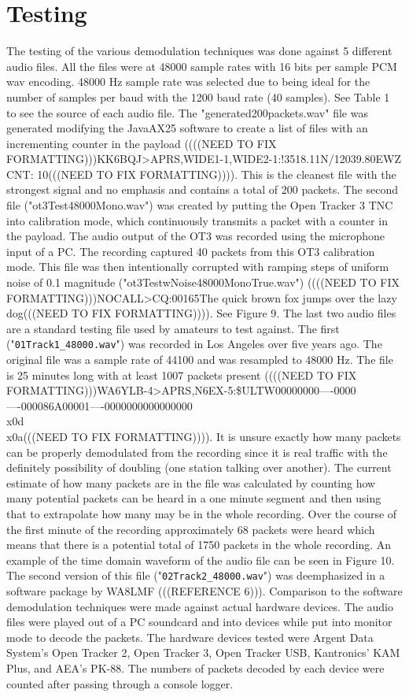 \chapter{Testing}

The testing of the various demodulation techniques was done against 5 different audio files. All the files were at 48000 sample rates with 16 bits per sample PCM wav encoding. 48000 Hz sample rate was selected due to being ideal for the number of samples per baud with the 1200 baud rate (40 samples). See Table 1 to see the source of each audio file. The "generated200packets.wav" file was generated modifying the JavaAX25 software to create a list of files with an incrementing counter in the payload ((((NEED TO FIX FORMATTING)))KK6BQJ>APRS,WIDE1-1,WIDE2-1:!3518.11N/12039.80EWZ CNT: 10(((NEED TO FIX FORMATTING)))). This is the cleanest file with the strongest signal and no emphasis and contains a total of 200 packets. The second file ("ot3Test48000Mono.wav") was created by putting the Open Tracker 3 TNC into calibration mode, which continuously transmits a packet with a counter in the payload. The audio output of the OT3 was recorded using the microphone input of a PC. The recording captured 40 packets from this OT3 calibration mode. This file was then intentionally corrupted with ramping steps of uniform noise of 0.1 magnitude ("ot3TestwNoise48000MonoTrue.wav") ((((NEED TO FIX FORMATTING)))NOCALL>CQ:00165The quick brown fox jumps over the lazy dog(((NEED TO FIX FORMATTING)))). See Figure 9.  The last two audio files are a standard testing file used by amateurs to test against. The first ("\verb|01Track1_48000.wav|") was recorded in Los Angeles over five years ago. The original file was a sample rate of 44100 and was resampled to 48000 Hz. The file is 25 minutes long with at least 1007 packets present ((((NEED TO FIX FORMATTING)))WA6YLB-4>APRS,N6EX-5:\$ULTW00000000----0000----000086A00001----0000000000000000\\x0d\\x0a(((NEED TO FIX FORMATTING)))). It is unsure exactly how many packets can be properly demodulated from the recording since it is real traffic with the definitely possibility of doubling (one station talking over another). The current estimate of how many packets are in the file was calculated by counting how many potential packets can be heard in a one minute segment and then using that to extrapolate how many may be in the whole recording. Over the course of the first minute of the recording approximately 68 packets were heard which means that there is a potential total of 1750 packets in the whole recording. An example of the time domain waveform of the audio file can be seen in Figure 10. The second version of this file ("\verb|02Track2_48000.wav|") was deemphasized in a software package by WA8LMF (((REFERENCE 6))). Comparison to the software demodulation techniques were made against actual hardware devices. The audio files were played out of a PC soundcard and into devices while put into monitor mode to decode the packets. The hardware devices tested were Argent Data System's Open Tracker 2, Open Tracker 3, Open Tracker USB, Kantronics' KAM Plus, and AEA's PK-88. The numbers of packets decoded by each device were counted after passing through a console logger.
